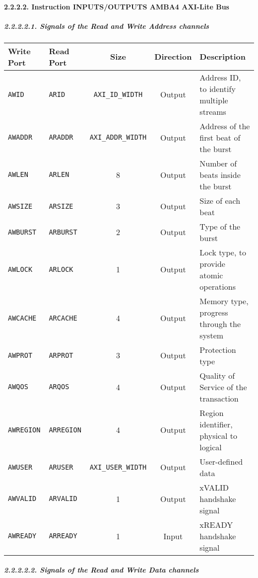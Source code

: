 \documentclass[]{article}
\let\oldparagraph\paragraph
\renewcommand{\paragraph}[1]{\oldparagraph{#1}\mbox{}}
\let\oldsubparagraph\subparagraph
\renewcommand{\subparagraph}[1]{\oldsubparagraph{#1}\mbox{}}
\begin{document}
\hypertarget{instruction-inputsoutputs-amba4-axi-lite-bus}{%
\paragraph{2.2.2.2. Instruction INPUTS/OUTPUTS AMBA4 AXI-Lite
Bus}\label{instruction-inputsoutputs-amba4-axi-lite-bus}}

\hypertarget{signals-of-the-read-and-write-address-channels}{%
\subparagraph{2.2.2.2.1. Signals of the Read and Write Address
channels}\label{signals-of-the-read-and-write-address-channels}}

\begin{longtable}[]{@{}llccl@{}}
\toprule
Write Port & Read Port & Size & Direction & Description\tabularnewline
\midrule
\endhead
\texttt{AWID} & \texttt{ARID} & \texttt{AXI\_ID\_WIDTH} & Output &
Address ID, to identify multiple streams\tabularnewline
\texttt{AWADDR} & \texttt{ARADDR} & \texttt{AXI\_ADDR\_WIDTH} & Output &
Address of the first beat of the burst\tabularnewline
\texttt{AWLEN} & \texttt{ARLEN} & 8 & Output & Number of beats inside
the burst\tabularnewline
\texttt{AWSIZE} & \texttt{ARSIZE} & 3 & Output & Size of each
beat\tabularnewline
\texttt{AWBURST} & \texttt{ARBURST} & 2 & Output & Type of the
burst\tabularnewline
\texttt{AWLOCK} & \texttt{ARLOCK} & 1 & Output & Lock type, to provide
atomic operations\tabularnewline
\texttt{AWCACHE} & \texttt{ARCACHE} & 4 & Output & Memory type, progress
through the system\tabularnewline
\texttt{AWPROT} & \texttt{ARPROT} & 3 & Output & Protection
type\tabularnewline
\texttt{AWQOS} & \texttt{ARQOS} & 4 & Output & Quality of Service of the
transaction\tabularnewline
\texttt{AWREGION} & \texttt{ARREGION} & 4 & Output & Region identifier,
physical to logical\tabularnewline
\texttt{AWUSER} & \texttt{ARUSER} & \texttt{AXI\_USER\_WIDTH} & Output &
User-defined data\tabularnewline
\texttt{AWVALID} & \texttt{ARVALID} & 1 & Output & xVALID handshake
signal\tabularnewline
\texttt{AWREADY} & \texttt{ARREADY} & 1 & Input & xREADY handshake
signal\tabularnewline
\bottomrule
\end{longtable}

\hypertarget{signals-of-the-read-and-write-data-channels}{%
\subparagraph{2.2.2.2.2. Signals of the Read and Write Data
channels}\label{signals-of-the-read-and-write-data-channels}}
\end{document}
